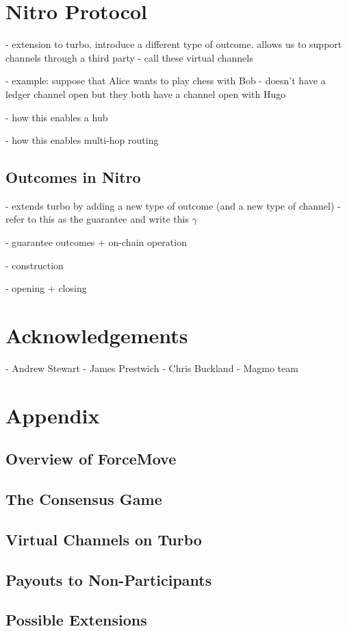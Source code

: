 \documentclass{article}
\theoremstyle{definition}
\begin{document}
\section{Nitro Protocol}

- extension to turbo. introduce a different type of outcome. allows us to support channels through
  a third party
- call these virtual channels

- example: suppose that Alice wants to play chess with Bob
- doesn't have a ledger channel open but they both have a channel open with Hugo

- how this enables a hub

- how this enables multi-hop routing

\subsection{Outcomes in Nitro}

- extends turbo by adding a new type of outcome (and a new type of channel)
- refer to this as the guarantee and write this $\gamma$

- guarantee outcomes + on-chain operation

- construction

- opening + closing


\section{Acknowledgements}

- Andrew Stewart
- James Prestwich
- Chris Buckland
- Magmo team


\section{Appendix}

\subsection{Overview of ForceMove}
\subsection{The Consensus Game}
\subsection{Virtual Channels on Turbo}
\subsection{Payouts to Non-Participants}
\subsection{Possible Extensions}
\end{document}
